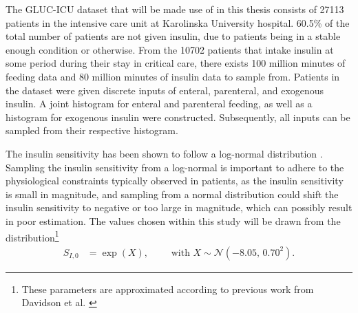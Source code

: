 \documentclass[nomenclature, english, bibtex]{kththesis}
\begin{document}

The GLUC-ICU dataset that will be made use of in this thesis consists of 27113 patients in the intensive care unit at Karolinska University hospital. 60.5\% of the total number of patients are not given insulin, due to patients being in a stable enough condition or otherwise. From the 10702 patients that intake insulin at some period during their stay in critical care, there exists 100 million minutes of feeding data and 80 million minutes of insulin data to sample from. Patients in the dataset were given discrete inputs of enteral, parenteral, and exogenous insulin. A joint histogram for enteral and parenteral feeding, as well as a histogram for exogenous insulin were constructed. Subsequently, all inputs can be sampled from their respective histogram.

The insulin sensitivity has been shown to follow a log-normal distribution \cite{davidson_multi-input_2019}. Sampling the insulin sensitivity from a log-normal is important to adhere to the physiological constraints typically observed in patients, as the insulin sensitivity is small in magnitude, and sampling from a normal distribution could shift the insulin sensitivity to negative or too large in magnitude, which can possibly result in poor estimation. The values chosen within this study will be drawn from the distribution\footnote{These parameters are approximated according to previous work from Davidson et al. \cite{davidson_multi-input_2019}}
\begin{align} \label{eq:SI}
S_{I,0} &= \exp(X), \qquad \text{ with } X \sim \mathcal{N}(-8.05,\,0.70^2).
\end{align}
\end{document}
